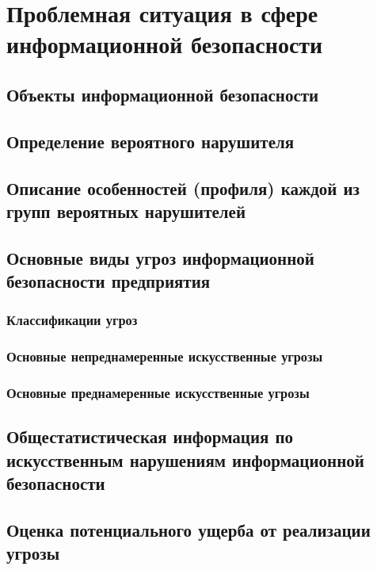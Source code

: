 
\section{Проблемная ситуация в сфере информационной безопасности}
\label{sec:problems}


\subsection{Объекты информационной безопасности}
\label{subsec:problems:objects}


\subsection{Определение вероятного нарушителя}
\label{subsec:problems:determination}


\subsection{Описание особенностей (профиля) каждой из групп вероятных нарушителей}
\label{subsec:problems:profile}


\subsection{Основные виды угроз информационной безопасности предприятия}
\label{subsec:problems:threats}

\subsubsection{Классификации угроз}
\label{subsubsec:problems:threats:classification}

\subsubsection{Основные непреднамеренные искусственные угрозы}
\label{subsubsec:problems:threats:unintentional}

\subsubsection{Основные преднамеренные искусственные угрозы}
\label{subsubsec:problems:threats:intentional}


\subsection{Общестатистическая информация по искусственным нарушениям информационной безопасности}
\label{subsec:problems:stats}


\subsection{Оценка потенциального ущерба от реализации угрозы}
\label{subsec:problems:damage_assessment}
